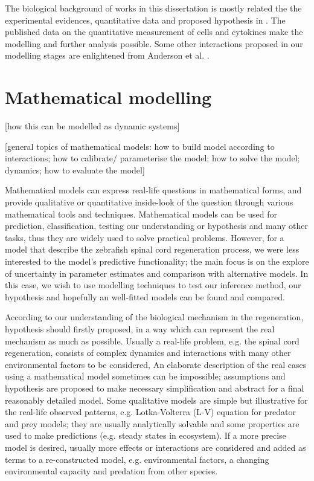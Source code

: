 The biological background of works in this dissertation is mostly related the the experimental evidences, quantitative data and proposed hypothesis in \cite{ref:Tsarouchas}. The published data on the quantitative measurement of cells and cytokines make the modelling and further analysis possible. Some other interactions proposed in our modelling stages are enlightened from Anderson et al. \cite{Anderson}.

\section{Mathematical modelling}

 [how this can be modelled as dynamic systems]

 [general topics of mathematical models: how to build model according to interactions; how to calibrate/ parameterise the model; how to solve the model; dynamics; how to evaluate the model]

Mathematical models can express real-life questions in mathematical forms, and provide qualitative or quantitative inside-look of the question through various mathematical tools and techniques. Mathematical models can be used for prediction, classification, testing our understanding or hypothesis and many other tasks, thus they are widely used to solve practical problems. However, for a model that describe the zebrafish spinal cord regeneration process, we were less interested to the model's predictive functionality; the main focus is on the explore of uncertainty in parameter estimates and comparison with alternative models. In this case, we wish to use modelling techniques to test our inference method, our hypothesis and hopefully an well-fitted models can be found and compared.

According to our understanding of the biological mechanism in the regeneration, hypothesis should firstly proposed, in a way which can represent the real  mechanism as much as possible. Usually a real-life problem, e.g. the spinal cord regeneration, consists of complex dynamics and interactions with many other environmental factors to be considered, An elaborate description of the real cases using a mathematical model sometimes can be impossible; assumptions and hypothesis are proposed to make necessary simplification and abstract for a final reasonably detailed model. Some qualitative models are simple but illustrative for the real-life observed patterns, e.g. Lotka-Volterra (L-V) equation for predator and prey models; they are usually analytically solvable and some properties are used to make predictions (e.g. steady states in ecosystem). If a more precise model is desired, usually more effects or interactions are considered and added as terms to a re-constructed model, e.g. environmental factors, a changing environmental capacity and predation from other species.

